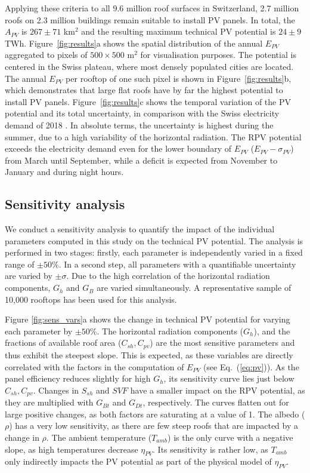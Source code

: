 Applying these criteria to all 9.6 million roof surfaces in Switzerland, 2.7 million roofs on 2.3 million buildings remain suitable to install PV panels. 
In total, the $A_{PV}$ is $267 \pm 71$ km$^2$ and the resulting maximum technical PV potential is $24 \pm 9$ TWh. Figure~\ref{fig:results}a shows the spatial distribution of the annual $E_{PV}$ aggregated to pixels of $500 \times 500$ m$^2$ for visualisation purposes. The potential is centered in the Swiss plateau, where most densely populated cities are located.
%
The annual $E_{PV}$ per rooftop of one such pixel is shown in Figure~\ref{fig:results}b, which demonstrates that large flat roofs have by far the highest potential to install PV panels.
%
Figure~\ref{fig:results}c shows the temporal variation of the PV potential and its total uncertainty, in comparison with the Swiss electricity demand of 2018 \cite{swissgrid_production_2019}. In absolute terms, the uncertainty is highest during the summer, due to a high variability of the horizontal radiation. The RPV potential exceeds the electricity demand even for the lower boundary of $E_{PV}$ ($E_{PV} - \sigma_{PV}$) from March until September, while a deficit is expected from November to January and during night hours. 

\subsection{Sensitivity analysis}

We conduct a sensitivity analysis to quantify the impact of the individual parameters computed in this study on the technical PV potential. The analysis is performed in two stages: firstly, each parameter is independently varied in a fixed range of $\pm 50\%$. 
In a second step, all parameters with a quantifiable uncertainty are varied by $\pm \sigma$. 
Due to the high correlation of the horizontal radiation components, $G_h$ and $G_B$ are varied simultaneously. A representative sample of 10,000 rooftops has been used for this analysis.

Figure \ref{fig:sens_vars}a shows the change in technical PV potential for varying each parameter by $\pm 50\%$. The horizontal radiation components ($G_h$), and the fractions of available roof area ($C_{sh}, C_{\mathit{pv}}$) are the most sensitive parameters and thus exhibit the steepest slope. 
This is expected, as these variables are directly correlated with the factors in the computation of $E_{PV}$ (see Eq.~(\ref{eq:pv})). 
As the panel efficiency reduces slightly for high $G_h$, its sensitivity curve lies just below $C_{sh}, C_{\mathit{pv}}$.
Changes in $S_{sh}$ and $\mathit{SVF}$ have a smaller impact on the RPV potential, as they are multiplied with $G_{Bt}$ and $G_{Dt}$, respectively. 
The curves flatten out for large positive changes, as both factors are saturating at a value of 1. 
The albedo ($\rho$) has a very low sensitivity, as there are few steep roofs that are impacted by a change in $\rho$.
The ambient temperature ($T_{amb}$) is the only curve with a negative slope, as high temperatures decrease $\eta_{PV}$. Its sensitivity is rather low, as $T_{amb}$ only indirectly impacts the PV potential as part of the physical model of $\eta_{PV}$. 

